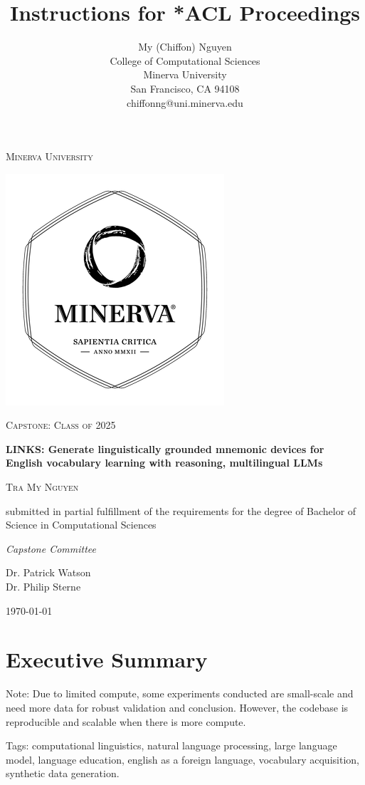 \documentclass[11pt]{article}
\title{Instructions for *ACL Proceedings}
\author{%
  My (Chiffon) Nguyen \\
  College of Computational Sciences \\
  Minerva University \\
  San Francisco, CA 94108 \\
  chiffonng@uni.minerva.edu
}
\begin{document}
\begin{titlepage}
\centering
{\scshape\LARGE Minerva University \par}
\vspace{1cm}
\begin{center}
    \includegraphics[width = 0.4\linewidth]{figures/minerva_logo.png}
\end{center}
{\scshape\Large Capstone: Class of 2025 \par}
\vspace{1.5cm}
{\huge\bfseries LINKS: Generate linguistically grounded mnemonic devices for English vocabulary learning with reasoning, multilingual LLMs \par}
\vspace{2cm}
{\scshape\large Tra My Nguyen \par}
submitted in partial fulfillment of the requirements for the degree of Bachelor of Science in Computational Sciences \par
\vspace{2cm}
{\large\itshape Capstone Committee \par}
Dr. Patrick Watson \\
Dr. Philip Sterne

\vfill
{\large \today\par}
\end{titlepage}

\onecolumn
\section*{Executive Summary}
Note: Due to limited compute, some experiments conducted are small-scale and need more data for robust validation and conclusion. However, the codebase is reproducible and scalable when there is more compute.

Tags: computational linguistics, natural language processing, large language model, language education, english as a foreign language, vocabulary acquisition, synthetic data generation.
\end{document}
